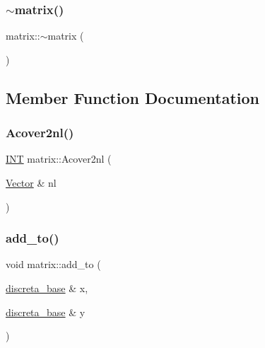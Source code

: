 \mbox{\label{classmatrix_a8a2522496ff0ef7096ffcfdc851b85a1}} 
\subsubsection{\texorpdfstring{$\sim$matrix()}{~matrix()}}
{\footnotesize\ttfamily matrix\+::$\sim$matrix (\begin{DoxyParamCaption}{ }\end{DoxyParamCaption})}



\subsection{Member Function Documentation}
\mbox{\label{classmatrix_a331c7926e93599378a25791e982b3c89}} 
\subsubsection{\texorpdfstring{Acover2nl()}{Acover2nl()}}
{\footnotesize\ttfamily \mbox{\hyperlink{galois_8h_a09fddde158a3a20bd2dcadb609de11dc}{I\+NT}} matrix\+::\+Acover2nl (\begin{DoxyParamCaption}\item[{\mbox{\hyperlink{class_vector}{Vector}} \&}]{nl }\end{DoxyParamCaption})}

\mbox{\label{classmatrix_a4ade010e5f49a23fab4cb5211b106e81}} 
\subsubsection{\texorpdfstring{add\+\_\+to()}{add\_to()}}
{\footnotesize\ttfamily void matrix\+::add\+\_\+to (\begin{DoxyParamCaption}\item[{\mbox{\hyperlink{classdiscreta__base}{discreta\+\_\+base}} \&}]{x,  }\item[{\mbox{\hyperlink{classdiscreta__base}{discreta\+\_\+base}} \&}]{y }\end{DoxyParamCaption})\hspace{0.3cm}{\ttfamily [virtual]}}



